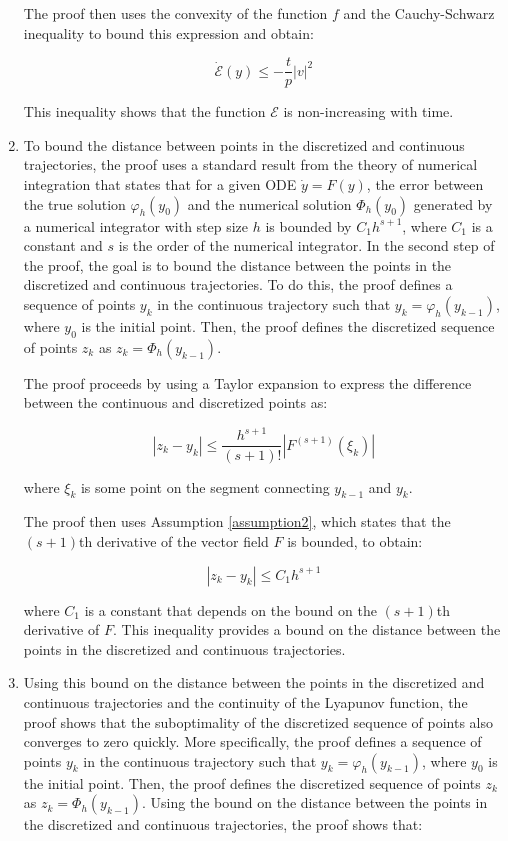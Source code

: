 \begin{enumerate}
          The proof then uses the convexity of the function $f$ and the Cauchy-Schwarz inequality to bound this expression and obtain:

          $$
              \dot{\mathcal{E}}(y) \le -\frac{t}{p} |v|^2
          $$

          This inequality shows that the function $\mathcal{E}$ is non-increasing with time.

    \item To bound the distance between points in the discretized and continuous trajectories, the proof uses a standard result from the theory of numerical integration that states that for a given ODE $\dot{y}=F(y)$, the error between the true solution $\varphi_h(y_0)$ and the numerical solution $\Phi_h(y_0)$ generated by a numerical integrator with step size $h$ is bounded by $C_1 h^{s+1}$, where $C_1$ is a constant and $s$ is the order of the numerical integrator.
          In the second step of the proof, the goal is to bound the distance between the points in the discretized and continuous trajectories. To do this, the proof defines a sequence of points $y_k$ in the continuous trajectory such that $y_k = \varphi_h(y_{k-1})$, where $y_0$ is the initial point. Then, the proof defines the discretized sequence of points $z_k$ as $z_k = \Phi_h(y_{k-1})$.

          The proof proceeds by using a Taylor expansion to express the difference between the continuous and discretized points as:

          $$
              |z_k - y_k| \le \frac{h^{s+1}}{(s+1)!} |F^{(s+1)}(\xi_k)|
          $$

          where $\xi_k$ is some point on the segment connecting $y_{k-1}$ and $y_k$.

          The proof then uses Assumption \ref{assumption2}, which states that the $(s+1)$th derivative of the vector field $F$ is bounded, to obtain:

          $$
              |z_k - y_k| \le C_1 h^{s+1}
          $$

          where $C_1$ is a constant that depends on the bound on the $(s+1)$th derivative of $F$. This inequality provides a bound on the distance between the points in the discretized and continuous trajectories.

    \item Using this bound on the distance between the points in the discretized and continuous trajectories and the continuity of the Lyapunov function, the proof shows that the suboptimality of the discretized sequence of points also converges to zero quickly.
          More specifically, the proof defines a sequence of points $y_k$ in the continuous trajectory such that $y_k = \varphi_h(y_{k-1})$, where $y_0$ is the initial point. Then, the proof defines the discretized sequence of points $z_k$ as $z_k = \Phi_h(y_{k-1})$. Using the bound on the distance between the points in the discretized and continuous trajectories, the proof shows that:


\end{enumerate}
